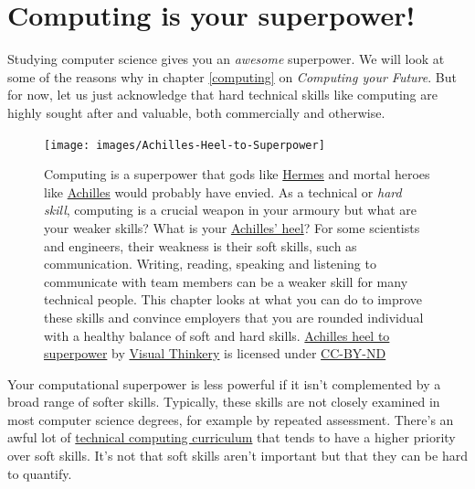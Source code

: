 \documentclass[
]{book}
\begin{document}
\hypertarget{superpower}{%
\section{Computing is your superpower!}\label{superpower}}

Studying computer science gives you an \emph{awesome} superpower. We will look at some of the reasons why in chapter \ref{computing} on \emph{Computing your Future}. But for now, let us just acknowledge that hard technical skills like computing are highly sought after and valuable, both commercially and otherwise.

\begin{figure}

{\centering \texttt{[image: images/Achilles-Heel-to-Superpower]} 

}

\caption{Computing is a superpower that gods like \href{https://en.wikipedia.org/wiki/Hermes}{Hermes} and mortal heroes like \href{https://en.wikipedia.org/wiki/Achilles}{Achilles} would probably have envied. \citep{heroes, mythos} As a technical or \emph{hard skill}, computing is a crucial weapon in your armoury but what are your weaker skills? What is your \href{https://en.wikipedia.org/wiki/Achilles\%27_heel}{Achilles' heel}? For some scientists and engineers, their weakness is their soft skills, such as communication. Writing, reading, speaking and listening to communicate with team members can be a weaker skill for many technical people. This chapter looks at what you can do to improve these skills and convince employers that you are rounded individual with a healthy balance of soft and hard skills. \href{https://bryanmmathers.com/achilles-heel-to-superpower/}{Achilles heel to superpower} by \href{https://visualthinkery.com}{Visual Thinkery} is licensed under \href{https://creativecommons.org/licenses/by-nd/4.0/}{CC-BY-ND}}\label{fig:achilles-fig}
\end{figure}



Your computational superpower is less powerful if it isn't complemented by a broad range of softer skills. Typically, these skills are not closely examined in most computer science degrees, for example by repeated assessment. There's an awful lot of \href{https://www.acm.org/education/curricula-recommendations}{technical computing curriculum} that tends to have a higher priority over soft skills. It's not that soft skills aren't important but that they can be hard to quantify.
\end{document}
